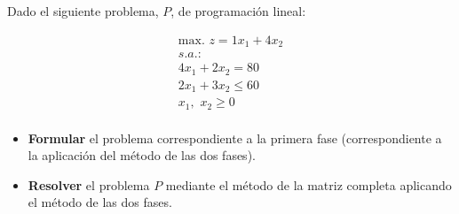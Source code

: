Dado el siguiente problema, $P$, de programación lineal:

\begin{equation}
\begin{split}
\label{eq:01a_dos_fases_a}
\mbox{max. } z = 1x_1 + 4x_2\\
s.a.:\\
4x_1 + 2x_2  = 80\\
2x_1 + 3x_2  \leq 60\\
x_1,\,\,x_2\geq 0\\
\end{split}
\end{equation}

\begin{itemize}
    \item \textbf{Formular} el problema correspondiente a la primera fase (correspondiente a la aplicación del método de las dos fases).
    \item \textbf{Resolver} el problema $P$ mediante el método de la matriz completa aplicando el método de las dos fases.
\end{itemize}
